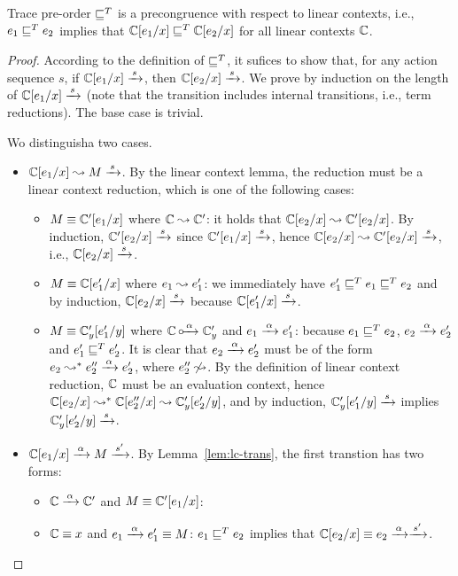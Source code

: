 \documentclass[10pt,a4]{article}
\begin{document}
\begin{theorem}
\label{thm:lc-trace}
Trace pre-order $\sqsubseteq^T$ is a precongruence with respect to linear contexts, i.e., 
$e_1 \sqsubseteq^T e_2$ implies that $\mathbb{C}[e_1 / x] \sqsubseteq^T \mathbb{C}[e_2 / x]$ for all linear contexts $\mathbb{C}$.
\end{theorem}
%
\begin{proof}
According to the definition of $\sqsubseteq^T$, it sufices to show that, for any action sequence $s$, 
if $\mathbb{C} [e_1 / x] \xrightarrow{\,{s}\,}$, then $\mathbb{C} [e_2 / x] \xrightarrow{\,{s}\,}$. 
We prove by induction on the length of $\mathbb{C}[e_1 /x ] \xrightarrow{\,{s}\,}$ (note that the 
transition includes internal transitions, i.e., term reductions). The base case is trivial.

Wo distinguisha two cases.
\begin{itemize}
\item $\mathbb{C}[e_1 / x] \leadsto M \xrightarrow{\,{s}\,}$. By the linear context lemma, the reduction must be 
  a linear context reduction, which is one of the following cases:
\begin{itemize}
\item $M \equiv \mathbb{C}'[e_1 / x]$ where $\mathbb{C} \leadsto \mathbb{C}'$: it holds that 
  $\mathbb{C}[e_2 / x] \leadsto \mathbb{C}'[e_2 / x]$. 
  By induction, $\mathbb{C}'[e_2/x] \xrightarrow{\,{s}\,}$ since $\mathbb{C}'[e_1/x] \xrightarrow{\,{s}\,}$, 
  hence $\mathbb{C}[e_2/x] \leadsto \mathbb{C}'[e_2/x] \xrightarrow{\,{s}\,}$, i.e., $\mathbb{C}[e_2/x] \xrightarrow{\,{s}\,}$.
\item $M \equiv \mathbb{C}[e_1' / x]$ where $e_1 \leadsto e_1'$: 
  we immediately have $e_1' \sqsubseteq^T e_1 \sqsubseteq^T e_2$ and by induction, 
  $\mathbb{C}[e_2 / x] \xrightarrow{\,{s}\,}$ because $\mathbb{C}[e_1' / x] \xrightarrow{\,{s}\,}$.
\item $M \equiv \mathbb{C}_y'[e_1' / y]$ where $\mathbb{C} \,\circ\hspace{-0.5em}\xrightarrow{\,{\alpha}\,} \mathbb{C}_y'$ 
  and $e_1 \xrightarrow{\,{\alpha}\,} e_1'$: because $e_1 \sqsubseteq^T e_2$, $e_2 \xrightarrow{\,{\alpha}\,} e_2'$ and 
  $e_1' \sqsubseteq^T e_2'$. It is clear that $e_2 \xrightarrow{\,{\alpha}\,} e_2'$ must be of the form 
  $e_2 \leadsto^* e_2'' \xrightarrow{\,{\alpha}\,} e_2'$, where $e_2'' \not\leadsto$. By the definition of 
  linear context reduction, $\mathbb{C}$ must be an evaluation context, hence 
  $\mathbb{C}[e_2 / x] \leadsto^* \mathbb{C}[e_2'' / x] \leadsto \mathbb{C}_y'[e_2' / y]$, 
  and by induction, $\mathbb{C}_y'[e_1' / y] \xrightarrow{\,{s}\,}$ implies $\mathbb{C}_y'[e_2' / y] \xrightarrow{\,{s}\,}$. 
\end{itemize}
\item $\mathbb{C}[e_1 / x] \xrightarrow{\,{\alpha}\,} M \xrightarrow{\,{s'}\,}$. By Lemma~\ref{lem:lc-trans}, the first transtion 
  has two forms:
\begin{itemize}
\item $\mathbb{C} \xrightarrow{\,{\alpha}\,} \mathbb{C}'$ and $M \equiv \mathbb{C}'[e_1/x]$: 
\item $\mathbb{C} \equiv x$ and $e_1 \xrightarrow{\,{\alpha}\,} e_1' \equiv M$: $e_1 \sqsubseteq^T e_2$ implies that 
  $\mathbb{C}[e_2/x] \equiv e_2 \xrightarrow{\,{\alpha}\,} \xrightarrow{\,{s'}\,}$.
\end{itemize}
\end{itemize}
\end{proof}
\end{document}

